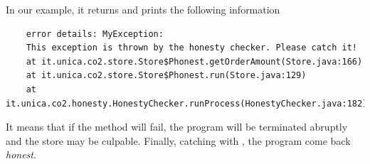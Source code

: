 In our example, it returns  and prints the following information
\begin{mdframed}
  \begin{verbatim}
    error details: MyException: 
    This exception is thrown by the honesty checker. Please catch it!
    at it.unica.co2.store.Store$Phonest.getOrderAmount(Store.java:166)
    at it.unica.co2.store.Store$Phonest.run(Store.java:129)
    at it.unica.co2.honesty.HonestyChecker.runProcess(HonestyChecker.java:182)
  \end{verbatim}
\end{mdframed}
It means that if the method  will fail,
the program will be terminated abruptly and the store may be culpable.
Finally, catching  with ,
the program come back \emph{honest}.





